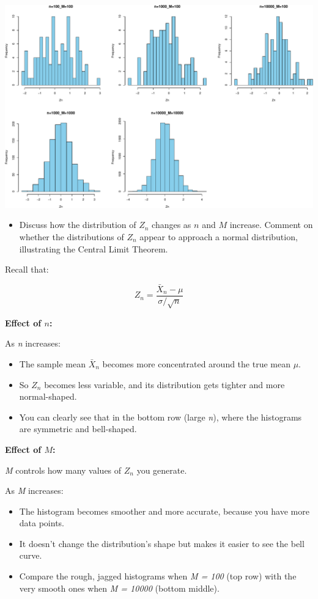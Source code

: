 \documentclass[
]{article}
\providecommand{\tightlist}{%
  \setlength{\itemsep}{0pt}\setlength{\parskip}{0pt}}
\begin{document}
\includegraphics{CS1_files/figure-latex/unnamed-chunk-20-1.pdf}

\begin{itemize}
\tightlist
\item
  Discuss how the distribution of \(Z_n\) changes as \(n\) and \(M\)
  increase. Comment on whether the distributions of \(Z_n\) appear to
  approach a normal distribution, illustrating the Central Limit
  Theorem.
\end{itemize}

Recall that:

\[
Z_n = \frac{\bar{X}_n - \mu}{\sigma / \sqrt{n}}
\]

\textbf{Effect of \(n\):}

As \emph{n} increases:

\begin{itemize}
\tightlist
\item
  The sample mean \(\bar{X}_n\) becomes more concentrated around the
  true mean \(\mu\).
\item
  So \(Z_n\) becomes less variable, and its distribution gets tighter
  and more normal-shaped.
\item
  You can clearly see that in the bottom row (large \emph{n}), where the
  histograms are symmetric and bell-shaped.
\end{itemize}

\textbf{Effect of \(M\):}

\emph{M} controls how many values of \(Z_n\) you generate.

As \emph{M} increases:

\begin{itemize}
\tightlist
\item
  The histogram becomes smoother and more accurate, because you have
  more data points.
\item
  It doesn't change the distribution's shape but makes it easier to see
  the bell curve.
\item
  Compare the rough, jagged histograms when \emph{M = 100} (top row)
  with the very smooth ones when \emph{M = 10000} (bottom middle).
\end{itemize}
\end{document}
